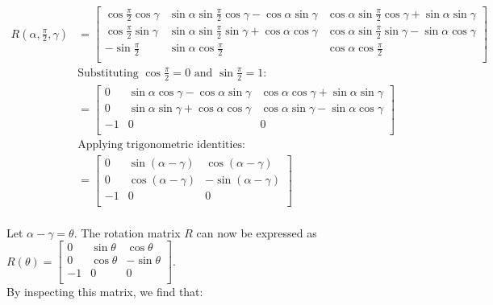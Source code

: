 \documentclass[12pt, a4paper]{article}
\begin{document}
\begin{align*} \\
    R(\alpha, \frac{\pi}{2}, \gamma)
     & = \begin{bmatrix}
             \cos\frac{\pi}{2}\cos\gamma & \sin\alpha\sin\frac{\pi}{2}\cos\gamma - \cos\alpha\sin\gamma & \cos\alpha\sin\frac{\pi}{2}\cos\gamma + \sin\alpha\sin\gamma \\
             \cos\frac{\pi}{2}\sin\gamma & \sin\alpha\sin\frac{\pi}{2}\sin\gamma + \cos\alpha\cos\gamma & \cos\alpha\sin\frac{\pi}{2}\sin\gamma - \sin\alpha\cos\gamma \\
             -\sin\frac{\pi}{2}          & \sin\alpha\cos\frac{\pi}{2}                                  & \cos\alpha\cos\frac{\pi}{2}                                  \\
         \end{bmatrix}
    \\
    &\text{Substituting $\cos\frac{\pi}{2} = 0$ and $\sin\frac{\pi}{2} = 1$:} \\
     & = \begin{bmatrix}
             0  & \sin\alpha\cos\gamma - \cos\alpha\sin\gamma & \cos\alpha\cos\gamma + \sin\alpha\sin\gamma \\
             0  & \sin\alpha\sin\gamma + \cos\alpha\cos\gamma & \cos\alpha\sin\gamma - \sin\alpha\cos\gamma \\
             -1 & 0                                           & 0                                           \\
         \end{bmatrix}
    \\
    &\text{Applying trigonometric identities:} \\
     & = \begin{bmatrix}
             0  & \sin(\alpha - \gamma) & \cos(\alpha - \gamma)  \\
             0  & \cos(\alpha - \gamma) & -\sin(\alpha - \gamma) \\
             -1 & 0                     & 0                      \\
         \end{bmatrix}
\end{align*} \\

Let $\alpha - \gamma = \theta$. The rotation matrix $R$ can now be expressed as
$R(\theta) =
    \begin{bmatrix} 0  & \sin\theta & \cos\theta  \\
    0  & \cos\theta & -\sin\theta \\
    -1 & 0          & 0           \\
\end{bmatrix}$.\\
By inspecting this matrix, we find that:
\end{document}
